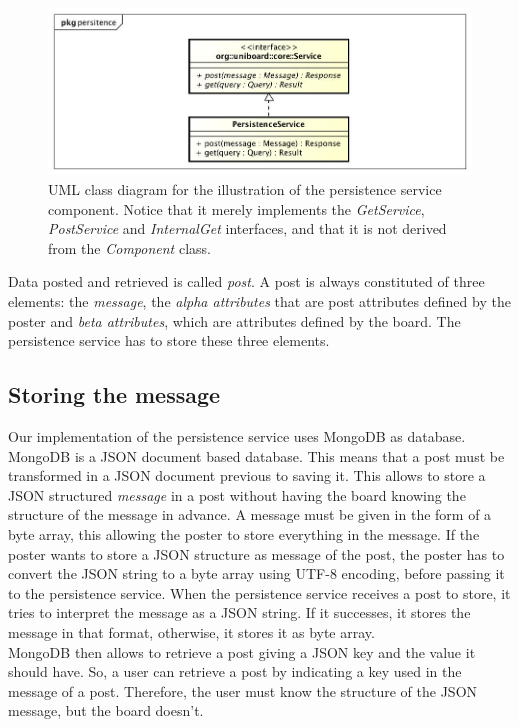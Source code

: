 \documentclass[oneside]{scrreprt}
\begin{document}
\begin{figure}[ht]
\centerline{
\includegraphics[width=1.0\textwidth]{figs/persistence-service}}
\caption{UML class diagram for the illustration of the
persistence service component. Notice that it merely implements
the \emph{GetService}, \emph{PostService} and \emph{InternalGet} interfaces, and that it is not derived
from the \emph{Component} class.}
\label{fig:persistence-service}
\end{figure}

Data posted and retrieved is called \emph{post}. A post is always constituted of three elements: the \emph{message}, the \emph{alpha attributes} that are post attributes defined by the poster and \emph{beta attributes}, which are attributes defined by the board. The persistence service has to store these three elements.

\subsection{Storing the message}

Our implementation of the persistence service uses MongoDB as database. MongoDB is a JSON document based database. This means that a post must be transformed in a JSON document previous to saving it. This allows to store a JSON structured \emph{message} in a post without having the board knowing the structure of the message in advance. A message must be given in the form of a byte array, this allowing the poster to store everything in the message. If the poster wants to store a JSON structure as message of the post, the poster has to convert the JSON string to a byte array using UTF-8 encoding, before passing it to the persistence service. When the persistence service receives a post to store, it tries to interpret the message as a JSON string. If it successes, it stores the message in that format, otherwise, it stores it as byte array. \\
MongoDB then allows to retrieve a post giving a JSON key and the value it should have. So, a user can retrieve a post by indicating a key used in the message of a post. Therefore, the user must know the structure of the JSON message, but the board doesn't.
\end{document}
